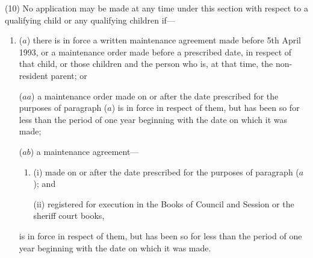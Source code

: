 \documentclass[a4paper]{article}
\begin{document}
(10) No
application may be made at any time under this section with respect
to a qualifying child or any qualifying children if---
\begin{enumerate}\item[]
($a$)
there is in force a written maintenance agreement made before 5th April
1993, or a maintenance order 
made before a prescribed date, in respect
of that child, or those children and the person who is, at that time, the non-resident parent; or

($aa$) a
maintenance order made on or after the date prescribed for the purposes
of paragraph ($a$) is in force in respect of them, but has been so for less than
the period of one year beginning with the date on which it was made;

($ab$) a
maintenance agreement---
\begin{enumerate}\item[]
(i)
made on or after the date prescribed for the purposes of paragraph ($a$);
and

(ii)
registered for execution in the Books of Council and Session or the
sheriff court books,
\end{enumerate}
is in force in respect of them, but has been so for less than the period of one year
beginning with the date on which it was made.
\end{enumerate}
\end{document}

